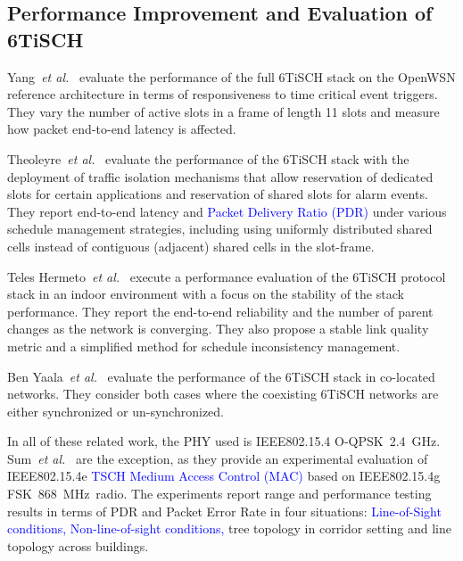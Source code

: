 \documentclass[sensors,article,submit,moreauthors,pdftex]{Definitions/mdpi}
\newcommand{\fsk}           {FSK~868~MHz}
\newcommand{\oqpsk}         {O-QPSK~2.4~GHz}
\newcommand{\etal}          {\textit{et al.}}
\newcommand{\update}[1]     {\textcolor{blue}{#1}}
\begin{document}
\subsection{Performance Improvement and Evaluation of 6TiSCH}
\label{sec:related_6tisch}

Yang~\etal~\cite{yang18analysis} evaluate the performance of the full 6TiSCH stack on the OpenWSN reference architecture in terms of responsiveness to time critical event triggers.
They vary the number of active slots in a frame of length 11 slots and measure how packet end-to-end latency is affected.

Theoleyre~\etal~\cite{theoleyre16experimental} evaluate the performance of the 6TiSCH stack with the deployment of traffic isolation mechanisms that allow reservation of dedicated slots for certain applications and reservation of shared slots for alarm events.
They report end-to-end latency and \update{Packet Delivery Ratio (PDR)} under various schedule management strategies,
    including using uniformly distributed shared cells instead of contiguous (adjacent) shared cells in the slot-frame.

Teles Hermeto~\etal~\cite{teleshermeto18reactions} execute a performance evaluation of the 6TiSCH protocol stack in an indoor environment with a focus on the stability of the stack performance.
They report the end-to-end reliability and the number of parent changes as the network is converging.
They also propose a stable link quality metric and a simplified method for schedule inconsistency management. 

Ben Yaala~\etal~\cite{benyaala16performance} evaluate the performance of the 6TiSCH stack in co-located networks.
They consider both cases where the coexisting 6TiSCH networks are either synchronized or un-synchronized.

In all of these related work, the PHY used is IEEE802.15.4 \oqpsk.
Sum~\etal~\cite{sum17experimental} are the exception, as they provide an experimental evaluation of IEEE802.15.4e \update {TSCH Medium Access Control (MAC)} based on IEEE802.15.4g \fsk\ radio.
The experiments report range and performance testing results in terms of PDR and Packet Error Rate in four situations:
    \update{Line-of-Sight conditions,
    Non-line-of-sight conditions,}
    tree topology in corridor setting and
    line topology across buildings.

\end{document}

